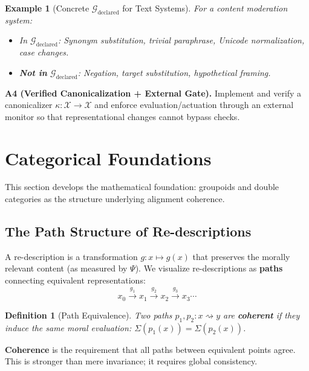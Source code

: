 \documentclass[12pt]{article}
\newtheorem{definition}[theorem]{Definition}
\newtheorem{example}[theorem]{Example}
\begin{document}
\begin{example}[Concrete $\mathcal{G}_{\mathrm{declared}}$ for Text Systems]
\emph{For a content moderation system:}
\begin{itemize}
    \item \emph{In} $\mathcal{G}_{\mathrm{declared}}$\emph{: Synonym substitution, trivial paraphrase, Unicode normalization, case changes.}
    \item \textbf{\emph{Not in}} $\mathcal{G}_{\mathrm{declared}}$\emph{: Negation, target substitution, hypothetical framing.}
\end{itemize}
\end{example}

\textbf{A4 (Verified Canonicalization + External Gate).} Implement and verify a canonicalizer $\kappa\colon \mathcal{X} \to \mathcal{X}$ and enforce evaluation/actuation through an external monitor so that representational changes cannot bypass checks.

\section{Categorical Foundations}

This section develops the mathematical foundation: groupoids and double categories as the structure underlying alignment coherence.

\subsection{The Path Structure of Re-descriptions}

A re-description is a transformation $g\colon x \mapsto g(x)$ that preserves the morally relevant content (as measured by $\Psi$). We visualize re-descriptions as \textbf{paths} connecting equivalent representations:
\[
x_0 \xrightarrow{g_1} x_1 \xrightarrow{g_2} x_2 \xrightarrow{g_3} x_3 \cdots
\]

\begin{definition}[Path Equivalence]
\emph{Two paths $p_1, p_2\colon x \rightsquigarrow y$ are \textbf{coherent} if they induce the same moral evaluation}: $\Sigma(p_1(x)) = \Sigma(p_2(x))$.
\end{definition}

\textbf{Coherence} is the requirement that all paths between equivalent points agree. This is stronger than mere invariance; it requires global consistency.
\end{document}
